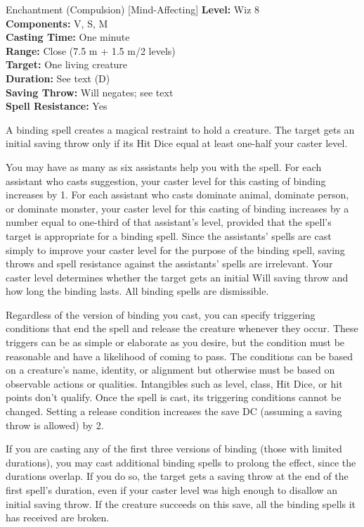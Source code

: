 {Enchantment (Compulsion) [Mind-Affecting]}
{
	\textbf{Level:}
	Wiz 8\\
	\textbf{Components:}
	V, S, M\\
	\textbf{Casting Time:}
	One minute\\
	\textbf{Range:}
	Close (7.5 m + 1.5 m/2 levels)\\
	\textbf{Target:}
	One living creature\\
	\textbf{Duration:}
	See text (D)\\
	\textbf{Saving Throw:}
	Will negates; see text\\
	\textbf{Spell Resistance:}
	Yes\\
}
{
	A binding spell creates a magical restraint to hold a creature. The target gets an initial saving throw only if its Hit Dice equal at least one-half your caster level.

	You may have as many as six assistants help you with the spell. For each assistant who casts suggestion, your caster level for this casting of binding increases by 1. For each assistant who casts dominate animal, dominate person, or dominate monster, your caster level for this casting of binding increases by a number equal to one-third of that assistant's level, provided that the spell's target is appropriate for a binding spell. Since the assistants' spells are cast simply to improve your caster level for the purpose of the binding spell, saving throws and spell resistance against the assistants' spells are irrelevant. Your caster level determines whether the target gets an initial Will saving throw and how long the binding lasts. All binding spells are dismissible.

	Regardless of the version of binding you cast, you can specify triggering conditions that end the spell and release the creature whenever they occur. These triggers can be as simple or elaborate as you desire, but the condition must be reasonable and have a likelihood of coming to pass. The conditions can be based on a creature's name, identity, or alignment but otherwise must be based on observable actions or qualities. Intangibles such as level, class, Hit Dice, or hit points don't qualify. Once the spell is cast, its triggering conditions cannot be changed. Setting a release condition increases the save DC (assuming a saving throw is allowed) by 2.

	If you are casting any of the first three versions of binding (those with limited durations), you may cast additional binding spells to prolong the effect, since the durations overlap. If you do so, the target gets a saving throw at the end of the first spell's duration, even if your caster level was high enough to disallow an initial saving throw. If the creature succeeds on this save, all the binding spells it has received are broken.

}

